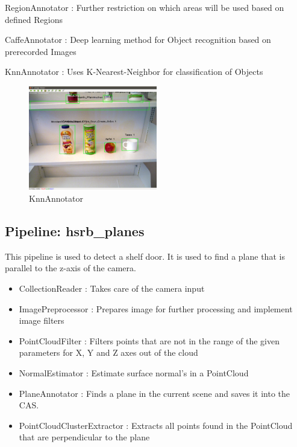\documentclass[main.tex]{subfiles}
\begin{document}
\begin{itemize}
	\item RegionAnnotator : Further restriction on which areas will be used based on defined Regions 
	\item CaffeAnnotator : Deep learning method for Object recognition based on prerecorded Images 

	\begin{minipage}[t]{\textwidth}
	\item KnnAnnotator : Uses K-Nearest-Neighbor for classification of Objects 
		\begin{figure}[H]
   			 \centering
    			 \includegraphics[width=0.5\textwidth]{pictures/2d/KnnAnnotator.png}
   			 \caption{KnnAnnotator}
  		\end{figure}
	\end{minipage}
\end{itemize}



			\subsection{Pipeline: hsrb\_planes} 
This pipeline is used to detect a shelf door. It is used to find a plane that is parallel to the z-axis of the camera.
\begin{itemize}
	\item CollectionReader : Takes care of the camera input
	\item ImagePreprocessor : Prepares image for further processing and implement image filters  
	\item PointCloudFilter : Filters points that are not in the range of the given parameters for X, Y and Z axes out of the cloud
	\item NormalEstimator : Estimate surface normal's in a PointCloud 
	\item PlaneAnnotator : Finds a plane in the current scene and saves it into the CAS.
	\item PointCloudClusterExtractor : Extracts all points found in the PointCloud that are perpendicular to the plane 
\end{itemize}
\end{document}
